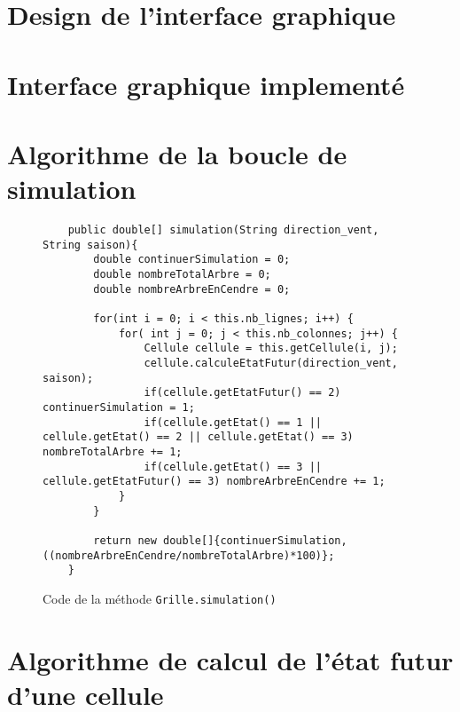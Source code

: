 \setcounter{page}{1}
\renewcommand{\thepage}{\hspace*{1em}A\arabic{page}}

\appendix
{}
{}

\section{Design de l'interface graphique}
\label{sec:annexe1}
\newpage
\section{Interface graphique implementé}
\label{sec:annexe2}
\newpage
\section{Algorithme de la boucle de simulation}
\label{sec:annexe3}

\begin{figure}[htbp]
    \centering
    \begin{lstlisting}
    public double[] simulation(String direction_vent, String saison){
        double continuerSimulation = 0;
        double nombreTotalArbre = 0;
        double nombreArbreEnCendre = 0;

        for(int i = 0; i < this.nb_lignes; i++) {
            for( int j = 0; j < this.nb_colonnes; j++) {
                Cellule cellule = this.getCellule(i, j);
                cellule.calculeEtatFutur(direction_vent, saison);
                if(cellule.getEtatFutur() == 2) continuerSimulation = 1;
                if(cellule.getEtat() == 1 || cellule.getEtat() == 2 || cellule.getEtat() == 3) nombreTotalArbre += 1;
                if(cellule.getEtat() == 3 || cellule.getEtatFutur() == 3) nombreArbreEnCendre += 1;
            }
        }

        return new double[]{continuerSimulation, ((nombreArbreEnCendre/nombreTotalArbre)*100)};
    }
    \end{lstlisting}
    \caption{Code de la méthode \texttt{Grille.simulation()}}
    \label{fig:boucleSimulation}
\end{figure}
\newpage
\section{Algorithme de calcul de l’état futur d’une cellule}
\label{sec:annexe4}

